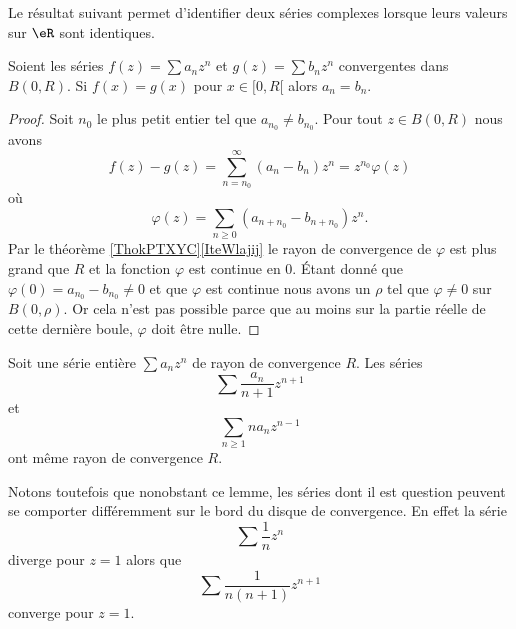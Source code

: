 
Le résultat suivant permet d'identifier deux séries complexes lorsque leurs valeurs sur \( \eR\) sont identiques.
\begin{proposition}
    Soient les séries \( f(z)=\sum a_nz^n\) et \( g(z)=\sum b_n z^n\) convergentes dans \( B(0,R)\). Si \( f(x)=g(x)\) pour \( x\in \mathopen[ 0 , R [\) alors \( a_n=b_n\).
\end{proposition}

\begin{proof}
    Soit \( n_0\) le plus petit entier tel que \( a_{n_0}\neq b_{n_0}\). Pour tout \( z\in B(0,R)\) nous avons
    \begin{equation}
        f(z)-g(z)=\sum_{n=n_0}^{\infty}(a_n-b_n)z^n=z^{n_0}\varphi(z)
    \end{equation}
    où
    \begin{equation}
        \varphi(z)=\sum_{n\geq 0}(a_{n+n_0}-b_{n+n_0})z^n.
    \end{equation}
    Par le théorème \ref{ThokPTXYC}\ref{IteWlajij} le rayon de convergence de \( \varphi\) est plus grand que \( R\) et la fonction \( \varphi\) est continue en \( 0\). Étant donné que \( \varphi(0)=a_{n_0}-b_{n_0}\neq 0\) et que \( \varphi\) est continue nous avons un \( \rho\) tel que \( \varphi\neq 0\) sur \( B(0,\rho)\). Or cela n'est pas possible parce que au moins sur la partie réelle de cette dernière boule, \( \varphi\) doit être nulle.
\end{proof}

\begin{lemma}       \label{LemFVMaSD}
    Soit une série entière \( \sum a_nz^n\) de rayon de convergence \( R\). Les séries
    \begin{equation}
        \sum \frac{ a_n }{ n+1 }z^{n+1}
    \end{equation}
    et
    \begin{equation}
        \sum_{n\geq 1}na_nz^{n-1}
    \end{equation}
    ont même rayon de convergence \( R\).
\end{lemma}

Notons toutefois que nonobstant ce lemme, les séries dont il est question peuvent se comporter différemment sur le bord du disque de convergence. En effet la série
\begin{equation}
    \sum \frac{1}{ n }z^n
\end{equation}
diverge pour \( z=1\) alors que 
\begin{equation}
    \sum\frac{1}{ n(n+1) }z^{n+1}
\end{equation}
converge pour \( z=1\).


